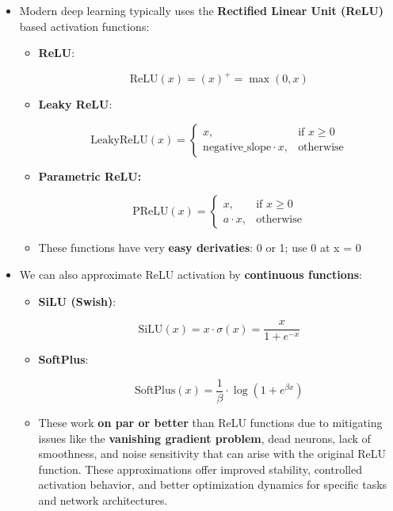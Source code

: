 \begin{itemize}
    \item Modern deep learning typically uses the \textbf{Rectified Linear Unit (ReLU)} based activation functions:
    \begin{itemize}
        \item \textbf{ReLU}:

\[\text{ReLU}(x) = (x)^+ = \max(0, x)\]

        \item \textbf{Leaky ReLU}:

\[
\text{LeakyReLU}(x) = \begin{cases}
x, & \text{if } x \geq 0 \\
\text{negative\_slope} \cdot x, & \text{otherwise}
\end{cases}\]


        \item \textbf{Parametric ReLU:}

\[\text{PReLU}(x) = \begin{cases}
x, & \text{if } x \geq 0 \\
a \cdot x, & \text{otherwise}
\end{cases}\]
\item These functions have very \textbf{easy derivaties}: 0 or 1; use 0 at x = 0
\end{itemize}
\item We can also approximate ReLU activation by \textbf{continuous functions}:
\begin{itemize}
    \item \textbf{SiLU (Swish)}:

\[\text{SiLU}(x) = x \cdot \sigma(x) = \frac{x}{1 + e^{-x}}\]

    \item \textbf{SoftPlus}:


\[\text{SoftPlus}(x) = \frac{1}{\beta} \cdot \log(1 + e^{\beta x})\]

    \item These work \textbf{on par or better} than ReLU functions  due to mitigating issues like the \textbf{vanishing gradient problem}, dead neurons, lack of smoothness, and noise sensitivity that can arise with the original ReLU function. These approximations offer improved stability, controlled activation behavior, and better optimization dynamics for specific tasks and network architectures.

\end{itemize}
\end{itemize}


